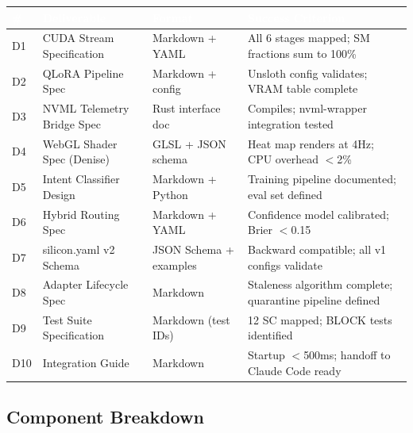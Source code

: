 \documentclass[11pt,letterpaper]{article}
\newcommand{\tableheader}[1]{\textbf{\sffamily\textcolor{white}{#1}}}
\begin{document}
\begin{center}
\begin{tabularx}{\textwidth}{C{0.6cm}L{3.8cm}L{2cm}X}
\toprule
{}
\tableheader{\#} & \tableheader{Deliverable} & \tableheader{Format} & \tableheader{Success Criterion} \\
\midrule
D1 & CUDA Stream Specification & Markdown + YAML & All 6 stages mapped; SM fractions sum to 100\% \\
D2 & QLoRA Pipeline Spec & Markdown + config & Unsloth config validates; VRAM table complete \\
D3 & NVML Telemetry Bridge Spec & Rust interface doc & Compiles; nvml-wrapper integration tested \\
D4 & WebGL Shader Spec (Denise) & GLSL + JSON schema & Heat map renders at 4Hz; CPU overhead $<$2\% \\
D5 & Intent Classifier Design & Markdown + Python & Training pipeline documented; eval set defined \\
D6 & Hybrid Routing Spec & Markdown + YAML & Confidence model calibrated; Brier $<$0.15 \\
D7 & silicon.yaml v2 Schema & JSON Schema + examples & Backward compatible; all v1 configs validate \\
D8 & Adapter Lifecycle Spec & Markdown & Staleness algorithm complete; quarantine pipeline defined \\
D9 & Test Suite Specification & Markdown (test IDs) & 12 SC mapped; BLOCK tests identified \\
D10 & Integration Guide & Markdown & Startup $<$500ms; handoff to Claude Code ready \\
\bottomrule
\end{tabularx}
\end{center}

\subsection{Component Breakdown}
\end{document}
